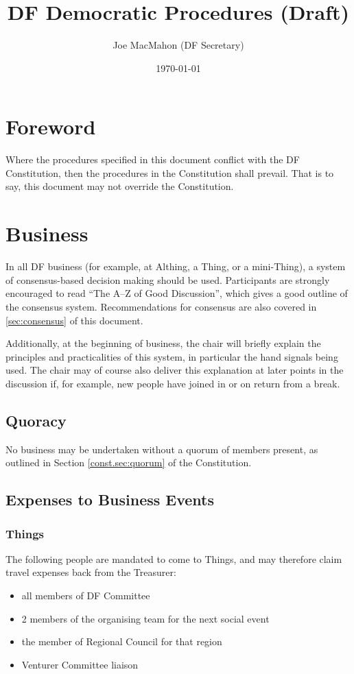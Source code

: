 \documentclass[a4paper, 12pt]{article} %
\title{DF Democratic Procedures (Draft)}
\author{Joe MacMahon (DF Secretary)}
\date{\today}
\begin{document}
\maketitle

\tableofcontents

\section{Foreword}
Where the procedures specified in this document conflict with the DF Constitution, then the procedures in the Constitution shall prevail.  That is to say, this document may not override the Constitution.

\section{Business}
In all DF business (for example, at Althing, a Thing, or a mini-Thing), a system of consensus-based decision making should be used.  Participants are strongly encouraged to read ``The A--Z of Good Discussion'', which gives a good outline of the consensus system.  Recommendations for consensus are also covered in \autoref{sec:consensus} of this document.

Additionally, at the beginning of business, the chair will briefly explain the principles and practicalities of this system, in particular the hand signals being used.  The chair may of course also deliver this explanation at later points in the discussion if, for example, new people have joined in or on return from a break.

\subsection{Quoracy}
No business may be undertaken without a quorum of members present, as outlined in Section \autoref{const.sec:quorum} of the Constitution.

\subsection{Expenses to Business Events}
\subsubsection{Things}
The following people are mandated to come to Things, and may therefore claim travel expenses back from the Treasurer:
\begin{itemize}
\item all members of DF Committee
\item 2 members of the organising team for the next social event
\item the member of Regional Council for that region
\item Venturer Committee liaison
\end{itemize}
\end{document}
